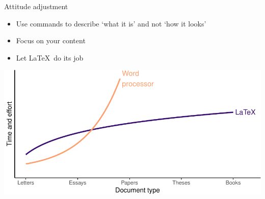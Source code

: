 \documentclass[,aspectratio=43]{beamer}
\begin{document}
\begin{frame}{Attitude adjustment}
\protect\hypertarget{attitude-adjustment}{}
\begin{itemize}
\item
  Use commands to describe `what it is' and not `how it looks'
\item
  Focus on your content
\item
  Let \LaTeX~do its job
\end{itemize}

\vspace{0.5em}

\begin{center}\includegraphics{figure/latexgraph-1} \end{center}
\end{frame}
\end{document}
